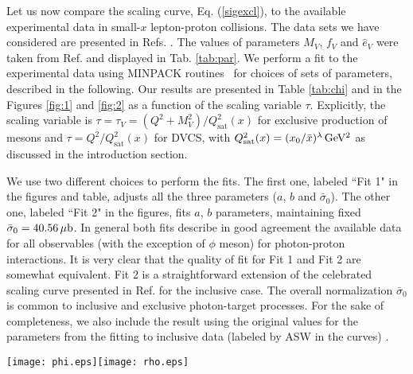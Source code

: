 \documentclass[twocolumn,showpacs,preprintnumbers,amsmath,amssymb,showkeys,aps,prd,a4paper,byrevtex]{revtex4}
\begin{document}
Let us now compare the scaling curve, Eq. (\ref{sigexcl}), to the available experimental data in small-$x$ lepton-proton collisions. The data sets we have considered are presented in Refs. \cite{dvcs,rho,phi,jpsi}. The values of parameters $M_V$, $f_V$ and $\hat{e}_V$ were taken  from Ref. \cite{Kowalski:2006hc} and displayed in Tab. \ref{tab:par}. We perform a fit to the experimental data using MINPACK routines~\cite{minpack} for choices of sets of parameters, described in the following. Our results are presented in Table \ref{tab:chi} and in the Figures \ref{fig:1} and \ref{fig:2} as a function of the scaling variable $\tau$. Explicitly, the scaling variable is $\tau = \tau_V = (Q^2 + M_V^2)/Q^2_\mathrm{sat}(x)$ for exclusive production of mesons and $\tau = Q^2/Q^2_\mathrm{sat}(x)$ for DVCS, with $Q^2_{\mathrm{sat}}(x)=\unit[(x_0/\bar{x})^{\lambda}]{GeV^2}$ as discussed in the introduction section.

We use two different choices to perform the fits. The first one, labeled ``Fit 1" in the figures and table, adjusts all the three parameters ($a$, $b$ and $\bar{\sigma}_0$). The other one, labeled ``Fit 2" in the figures, fits $a$, $b$ parameters, maintaining fixed $\bar{\sigma}_0 = \unit[40.56]{\mu b}$. In general both fits describe in good agreement the available data for all observables (with the exception of $\phi$ meson) for photon-proton interactions. It is very clear that the quality of fit for Fit 1 and Fit 2 are somewhat equivalent. Fit 2 is a straightforward extension of the celebrated scaling curve presented in Ref. \cite{Armesto_scal} for the inclusive case. The overall normalization $\bar{\sigma}_0$ is common to inclusive and exclusive photon-target processes. For the sake of completeness, we also include the result using the original values for the parameters from the fitting to inclusive data \cite{Armesto_scal} (labeled by ASW in the curves) .


\begin{figure*}[t]
\texttt{[image: phi.eps]}\texttt{[image: rho.eps]}
\caption{The cross section for $\phi$ \cite{phi} (left panel) and $\rho$ \cite{rho} production (right panel) as a function of the corresponding scaling variable $\tau$. The ASW result is represented by a dot-dashed line, the Fit 1 by solid lines and Fit 2 by the dashed ones.} 
\label{fig:2}
\end{figure*}
\end{document}
